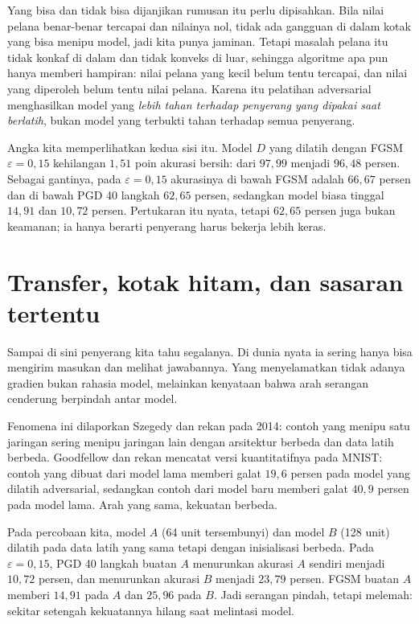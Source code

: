 Yang bisa dan tidak bisa dijanjikan rumusan itu perlu dipisahkan. Bila nilai pelana
benar-benar tercapai dan nilainya nol, tidak ada gangguan di dalam kotak yang bisa
menipu model, jadi kita punya jaminan. Tetapi masalah pelana itu tidak konkaf di dalam
dan tidak konveks di luar, sehingga algoritme apa pun hanya memberi hampiran: nilai
pelana yang kecil belum tentu tercapai, dan nilai yang diperoleh belum tentu nilai
pelana. Karena itu pelatihan adversarial menghasilkan model yang \emph{lebih tahan
terhadap penyerang yang dipakai saat berlatih}, bukan model yang terbukti tahan
terhadap semua penyerang.

Angka kita memperlihatkan kedua sisi itu. Model $D$ yang dilatih dengan FGSM
$\varepsilon=0{,}15$ kehilangan $1{,}51$ poin akurasi bersih: dari $97{,}99$ menjadi
$96{,}48$ persen. Sebagai gantinya, pada $\varepsilon=0{,}15$ akurasinya di bawah
FGSM adalah $66{,}67$ persen dan di bawah PGD 40 langkah $62{,}65$ persen, sedangkan
model biasa tinggal $14{,}91$ dan $10{,}72$ persen. Pertukaran itu nyata, tetapi
$62{,}65$ persen juga bukan keamanan; ia hanya berarti penyerang harus bekerja lebih
keras.

\section{Transfer, kotak hitam, dan sasaran tertentu}

Sampai di sini penyerang kita tahu segalanya. Di dunia nyata ia sering hanya bisa
mengirim masukan dan melihat jawabannya. Yang menyelamatkan tidak adanya gradien
bukan rahasia model, melainkan kenyataan bahwa arah serangan cenderung berpindah
antar model.


Fenomena ini dilaporkan Szegedy dan rekan pada 2014: contoh yang menipu satu jaringan
sering menipu jaringan lain dengan arsitektur berbeda dan data latih berbeda.
Goodfellow dan rekan mencatat versi kuantitatifnya pada MNIST: contoh yang dibuat
dari model lama memberi galat $19{,}6$ persen pada model yang dilatih adversarial,
sedangkan contoh dari model baru memberi galat $40{,}9$ persen pada model lama.
Arah yang sama, kekuatan berbeda.

Pada percobaan kita, model $A$ (64 unit tersembunyi) dan model $B$ (128 unit) dilatih
pada data latih yang sama tetapi dengan inisialisasi berbeda. Pada
$\varepsilon=0{,}15$, PGD 40 langkah buatan $A$ menurunkan akurasi $A$ sendiri menjadi
$10{,}72$ persen, dan menurunkan akurasi $B$ menjadi $23{,}79$ persen. FGSM buatan
$A$ memberi $14{,}91$ pada $A$ dan $25{,}96$ pada $B$. Jadi serangan pindah, tetapi
melemah: sekitar setengah kekuatannya hilang saat melintasi model.

